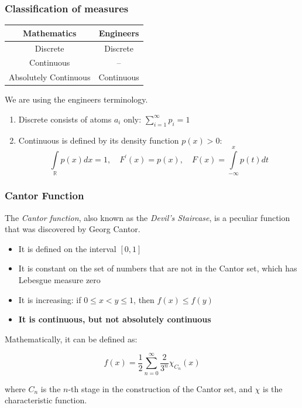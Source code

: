 \documentclass[fullscreen=true, bookmarks=true, hyperref={pdfencoding=unicode}]{beamer}
\begin{document}
\begin{frame}
  \frametitle{Classification of measures}

  \centering
  \begin{tabular}{|c|c|}
    \hline
    \textbf{Mathematics} & \textbf{Engineers} \\
    \hline
    Discrete &  Discrete \\
    Continuous &  -- \\
    Absolutely Continuous &  Continuous \\
    \hline
  \end{tabular}

  \pause\vspace{1cm}
  We are using the engineers terminology.
  
  \begin{enumerate}
    \pause\item Discrete consists of atoms $a_i$ only: $\sum\limits_{i=1}^\infty p_i = 1$
    \pause\item Continuous is defined by its density function $p(x) > 0$:
    $$\int\limits_{\mathbb{R}} p(x)dx = 1,\quad F^\prime(x) = p(x),\quad F(x) = \int\limits_{-\infty}^x p(t)dt$$
  \end{enumerate}
\end{frame}


\begin{frame}
  \frametitle{Cantor Function}
  
  The \textit{Cantor function}, also known as the \textit{Devil's Staircase}, 
  is a peculiar function that was discovered by Georg Cantor. 
  
  \begin{itemize}
      \pause\item It is defined on the interval $[0, 1]$
      \pause\item It is constant on the set of numbers that are not in the Cantor set, 
      which has Lebesgue measure zero
      \pause\item It is increasing: if $0 \leq x < y \leq 1$, then $f(x) \leq f(y)$
      \pause\item \textbf{It is continuous, but not absolutely continuous}
  \end{itemize}
  
  Mathematically, it can be defined as:
  
  \[ f(x) = \frac{1}{2} \sum_{n=0}^{\infty} \frac{2}{3^n} \chi_{C_n}(x) \]
  
  where $C_n$ is the $n$-th stage in the construction of the Cantor set, 
  and $\chi$ is the characteristic function.  
\end{frame}
\end{document}
